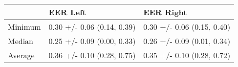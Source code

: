 \begin{tabular}{lll}
\toprule
{} &                    EER Left &                   EER Right \\
\midrule
Minimum &  0.30 +/- 0.06 (0.14, 0.39) &  0.30 +/- 0.06 (0.15, 0.40) \\
Median  &  0.25 +/- 0.09 (0.00, 0.33) &  0.26 +/- 0.09 (0.01, 0.34) \\
Average &  0.36 +/- 0.10 (0.28, 0.75) &  0.35 +/- 0.10 (0.28, 0.72) \\
\bottomrule
\end{tabular}
